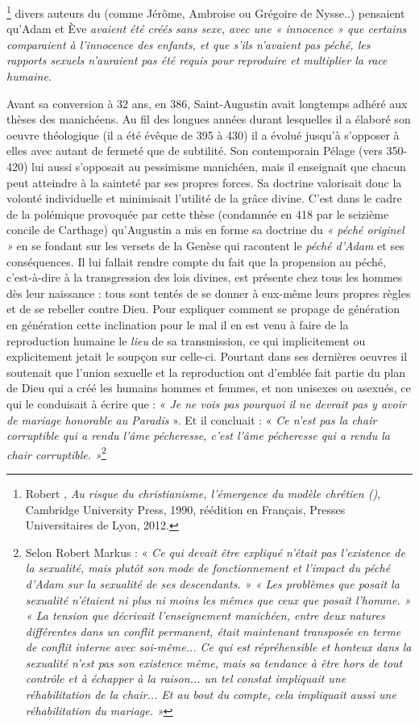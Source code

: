 \footnote{Robert , \emph{Au risque du christianisme, l'émergence du modèle chrétien ()}, Cambridge University Press, 1990, réédition en Français, Presses Universitaires de Lyon, 2012.} 
divers auteurs du  (comme Jérôme, Ambroise ou Grégoire de Nysse..) pensaient qu'Adam et Ève \emph{avaient été créés sans sexe, avec une « innocence » que certains comparaient à l'innocence des enfants, et que s'ils n'avaient pas péché, les rapports sexuels n'auraient pas été requis pour reproduire et multiplier la race humaine}.

 Avant sa conversion à 32 ans, en 386, Saint-Augustin avait longtemps adhéré aux thèses des manichéens. Au fil des longues années durant lesquelles il a élaboré son oeuvre théologique (il a été évêque de 395 à 430) il a évolué jusqu'à s'opposer à elles avec autant de fermeté que de subtilité. Son contemporain Pélage (vers 350-420) lui aussi s'opposait au pessimisme manichéen, mais il enseignait que chacun peut atteindre à la sainteté par ses propres forces. Sa doctrine valorisait donc la volonté individuelle et minimisait l'utilité de la grâce divine. C'est dans le cadre de la polémique provoquée par cette thèse (condamnée en 418 par le seizième concile de Carthage) qu'Augustin a mis en forme sa doctrine du \emph{« péché originel »} en se fondant sur les versets de la Genèse qui racontent le \emph{péché d'Adam} et ses conséquences. Il lui fallait rendre compte du fait que la propension au péché, c'est-à-dire à la transgression des lois divines, est présente chez tous les hommes dès leur naissance : tous sont tentés de se donner à eux-même leurs propres règles et de se rebeller contre Dieu. Pour expliquer comment se propage de génération en génération cette inclination pour le mal il en est venu à faire de la reproduction humaine le \emph{lieu} de sa transmission, ce qui implicitement ou explicitement jetait le soupçon sur celle-ci. Pourtant dans ses dernières oeuvres il soutenait que l'union sexuelle et la reproduction ont d'emblée fait partie du plan de Dieu qui a créé les humains hommes et femmes, et non unisexes ou asexués, ce qui le conduisait à écrire que : « \emph{Je ne vois pas pourquoi il ne devrait pas y avoir de mariage honorable au Paradis} ». Et il concluait : « \emph{Ce n'est pas la chair corruptible qui a rendu l'âme pécheresse, c'est l'âme pécheresse qui a rendu la chair corruptible. »}\footnote{Selon Robert Markus :  «\emph{ Ce qui devait être expliqué n'était pas l'existence de la sexualité, mais plutôt son mode de fonctionnement et l'impact du péché d'Adam sur la sexualité de ses descendants. » « Les problèmes que posait la sexualité n'étaient ni plus ni moins les mêmes que ceux que posait l'homme. »  « La tension que décrivait l'enseignement manichéen, entre deux natures différentes dans un conflit permanent, était maintenant transposée en terme de conflit interne avec soi-même... Ce qui est répréhensible et honteux dans la sexualité n'est pas son existence même, mais sa tendance à être hors de tout contrôle et à échapper à la raison... un tel constat impliquait une réhabilitation de la chair... Et au bout du compte, cela impliquait aussi une réhabilitation du mariage. »}} 
 
